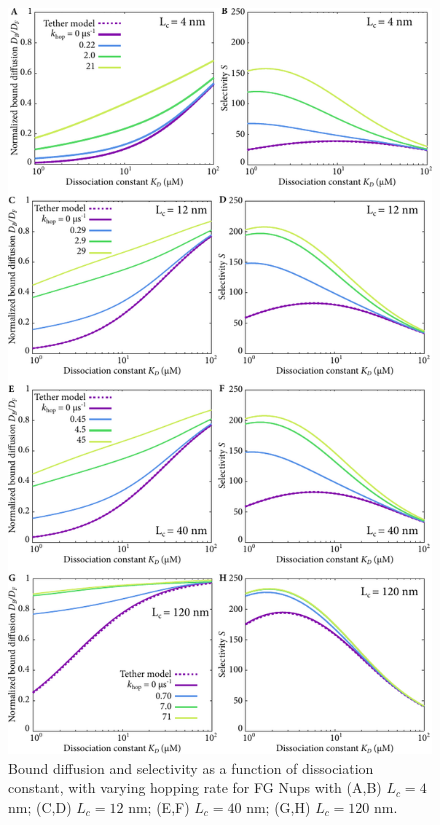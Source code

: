 \begin{figure}[t!]
\centering
\includegraphics[width=0.7\linewidth]{figs/ch02/all_hopping_results.pdf}
\caption[Effect of Nup contour length and hopping rate on selectivity.]{Bound diffusion and selectivity as a function of dissociation
  constant, with varying hopping rate for FG Nups with (A,B) $L_c = 4$ nm; (C,D) $L_c = 12$ nm; (E,F) $L_c = 40$ nm; (G,H) $L_c = 120$ nm.}
\label{fig:hop-results}
\end{figure}

